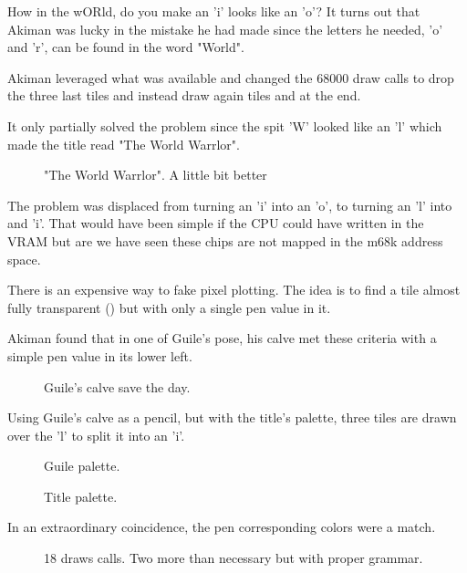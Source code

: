 How in the wORld, do you make an 'i' looks like an 'o'? It turns out that Akiman was lucky in the mistake he had made since the letters he needed, 'o' and 'r', can be found in the word "World".

Akiman leveraged what was available and changed the 68000 draw calls to drop the three last tiles and instead draw again tiles  and  at the end.

It only partially solved the problem since the spit 'W' looked like an 'l' which made the title read "The World Warrlor". 

\begin{figure}[H]
 \caption*{"The World Warrlor". A little bit better}%
 \end{figure}%


The problem was displaced from turning an 'i' into an 'o', to turning an 'l' into and 'i'. That would have been simple if the CPU could have written in the VRAM but are we have seen these chips are not mapped in the m68k address space.

There is an expensive way to fake pixel plotting. The idea is to find a tile almost fully transparent () but with only a single pen value in it. 

Akiman found that in one of Guile's pose, his calve met these criteria with a simple pen value in its lower left.

\begin{figure}[H]
\caption*{Guile's calve save the day.}%
 \end{figure}%

Using Guile's calve as a pencil, but with the title's palette, three tiles are drawn over the 'l' to split it into an 'i'.

\begin{figure}[H]
 \caption*{Guile palette.}%
 \end{figure}%

 \begin{figure}[H]
 \caption*{Title palette.}%
 \end{figure}%


 In an extraordinary coincidence, the pen corresponding colors were a match.

\begin{figure}[H]
 \caption*{18 draws calls. Two more than necessary but with proper grammar.}%
 \end{figure}%

